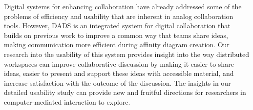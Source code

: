 Digital systems for enhancing collaboration have already addressed some of the problems of efficiency and usability that are inherent in analog collaboration tools. However, DADS is an integrated system for digital collaboration that builds on previous work to improve a common way that teams share ideas, making communication more efficient during affinity diagram creation. Our research into the usability of this system provides insight into the way distributed workspaces can improve collaborative discussion by making it easier to share ideas, easier to present and support these ideas with accessible material, and increase satisfaction with the outcome of the discussion. The insights in our detailed usability study can provide new and fruitful directions for researchers in computer-mediated interaction to explore.